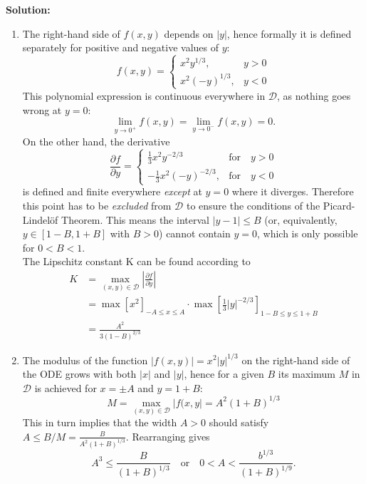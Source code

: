 \documentclass[11pt,a4paper,twoside]{report}
\begin{document}
	\textbf{Solution:}
	\begin{enumerate}[\bfseries i)]
		\item The right-hand side of $f(x, y)$ depends on $|y|$, hence formally it is defined separately for positive and negative values of $y$:
		$$
		f(x,y)
		=
		\begin{cases}
			x^2y^{1/3}, &y>0\\
			x^2(-y)^{1/3}, &y<0
		\end{cases}
		$$
		This polynomial expression is continuous everywhere in $\mathcal{D}$, as nothing goes wrong at $y = 0$:
		$$
		\lim_{y \to 0^+}f(x, y) = \lim_{y \to 0^-}f(x,y)=0.
		$$
		On the other hand, the derivative
		$$
		\frac{\partial f}{\partial y}
		=
		\begin{cases}
			\frac{1}{3}x^2y^{-2/3} & \text{for} \quad y>0\\
			-\frac{1}{3}x^2(-y)^{-2/3}, & \text{for} \quad y<0
		\end{cases}
		$$
		is defined and finite everywhere \textit{except} at $y = 0$ where it diverges. Therefore this point has to be \textit{excluded} from $\mathcal{D}$ to ensure the conditions of the Picard-Lindel\"{o}f Theorem. This means the interval $|y − 1| \leq B$ (or, equivalently, $y \in [1 − B, 1 + B]$ with $B > 0$) cannot contain $y = 0$, which is only possible for $0 < B < 1$.\\
		The Lipschitz constant K can be found according to
		\begin{equation*}
			\begin{split}
				K &= \max_{(x,y)\in\mathcal{D}}\left\lvert \frac{\partial f}{\partial y}\right\rvert \\
		&= \max \left[x^2\right]_{-A \leq x \leq A} \cdot \max\left[\frac{1}{3}|y|^{-2/3}\right]_{1-B\leq y \leq 1+B}\\
		&= \frac{A^2}{3(1-B)^{2/3}}
			\end{split}
		\end{equation*}
		\item The modulus of the function $|f(x,y)| = x^2|y|^{1/3}$ on the right-hand side of the ODE grows with both $|x|$ and $|y|$, hence for a given $B$ its maximum $M$ in $\mathcal{D}$ is achieved for $x = \pm A$ and $y = 1 + B$:
		$$
		M = \max_{(x,y)\in \mathcal{D}}|f(x,y| = A^2(1+B)^{1/3}
		$$
		This in turn implies that the width $A > 0$ should satisfy $A \leq B/M = \frac{B}{A^2(1+B)^{1/3}}$. Rearranging gives
		$$
		A^3\leq \frac{B}{(1+B)^{1/3}}\quad \text{or} \quad 0<A<\frac{b^{1/3}}{(1+B)^{1/9}}.
		$$
	\end{enumerate}
\end{document}
